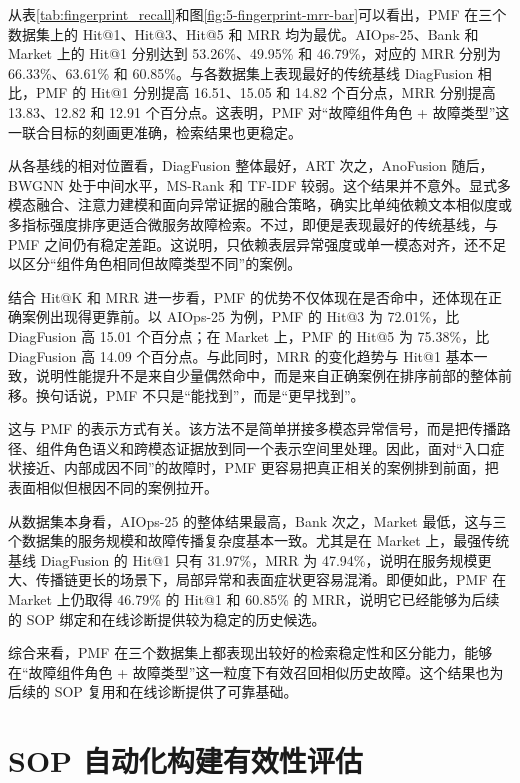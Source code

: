 从表\ref{tab:fingerprint_recall}和图\ref{fig:5-fingerprint-mrr-bar}可以看出，PMF 在三个数据集上的 Hit@1、Hit@3、Hit@5 和 MRR 均为最优。AIOps-25、Bank 和 Market 上的 Hit@1 分别达到 53.26\%、49.95\% 和 46.79\%，对应的 MRR 分别为 66.33\%、63.61\% 和 60.85\%。与各数据集上表现最好的传统基线 DiagFusion 相比，PMF 的 Hit@1 分别提高 16.51、15.05 和 14.82 个百分点，MRR 分别提高 13.83、12.82 和 12.91 个百分点。这表明，PMF 对“故障组件角色 + 故障类型”这一联合目标的刻画更准确，检索结果也更稳定。

从各基线的相对位置看，DiagFusion 整体最好，ART 次之，AnoFusion 随后，BWGNN 处于中间水平，MS-Rank 和 TF-IDF 较弱。这个结果并不意外。显式多模态融合、注意力建模和面向异常证据的融合策略，确实比单纯依赖文本相似度或多指标强度排序更适合微服务故障检索。不过，即便是表现最好的传统基线，与 PMF 之间仍有稳定差距。这说明，只依赖表层异常强度或单一模态对齐，还不足以区分“组件角色相同但故障类型不同”的案例。

结合 Hit@K 和 MRR 进一步看，PMF 的优势不仅体现在是否命中，还体现在正确案例出现得更靠前。以 AIOps-25 为例，PMF 的 Hit@3 为 72.01\%，比 DiagFusion 高 15.01 个百分点；在 Market 上，PMF 的 Hit@5 为 75.38\%，比 DiagFusion 高 14.09 个百分点。与此同时，MRR 的变化趋势与 Hit@1 基本一致，说明性能提升不是来自少量偶然命中，而是来自正确案例在排序前部的整体前移。换句话说，PMF 不只是“能找到”，而是“更早找到”。

这与 PMF 的表示方式有关。该方法不是简单拼接多模态异常信号，而是把传播路径、组件角色语义和跨模态证据放到同一个表示空间里处理。因此，面对“入口症状接近、内部成因不同”的故障时，PMF 更容易把真正相关的案例排到前面，把表面相似但根因不同的案例拉开。

从数据集本身看，AIOps-25 的整体结果最高，Bank 次之，Market 最低，这与三个数据集的服务规模和故障传播复杂度基本一致。尤其是在 Market 上，最强传统基线 DiagFusion 的 Hit@1 只有 31.97\%，MRR 为 47.94\%，说明在服务规模更大、传播链更长的场景下，局部异常和表面症状更容易混淆。即便如此，PMF 在 Market 上仍取得 46.79\% 的 Hit@1 和 60.85\% 的 MRR，说明它已经能够为后续的 SOP 绑定和在线诊断提供较为稳定的历史候选。

综合来看，PMF 在三个数据集上都表现出较好的检索稳定性和区分能力，能够在“故障组件角色 + 故障类型”这一粒度下有效召回相似历史故障。这个结果也为后续的 SOP 复用和在线诊断提供了可靠基础。


\section{SOP 自动化构建有效性评估}

